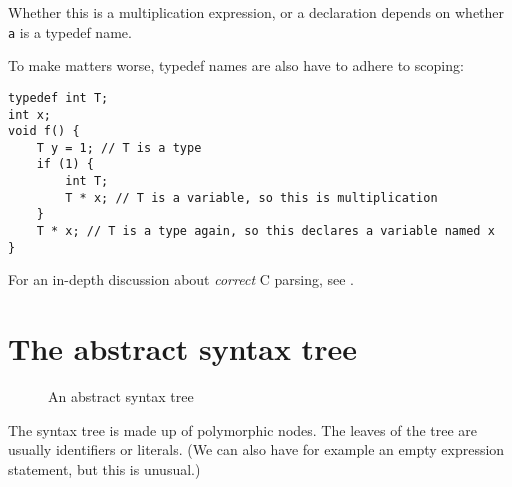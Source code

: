 \documentclass[12pt]{article}
\begin{document}
Whether this is a multiplication expression, or a declaration depends on
whether \texttt{a} is a typedef name.

To make matters worse, typedef names are also have to adhere to scoping:
\begin{center}
\begin{BVerbatim}
typedef int T;
int x;
void f() {
	T y = 1; // T is a type
	if (1) {
		int T;
		T * x; // T is a variable, so this is multiplication
	}
	T * x; // T is a type again, so this declares a variable named x
}
\end{BVerbatim}
\end{center}

For an in-depth discussion about \emph{correct} C parsing, see
\cite{c11_parsing}.

\section{The abstract syntax tree}

\begin{figure}
\centering
{}
\caption{An abstract syntax tree}
\label{fig:ast}
\end{figure}

The syntax tree is made up of polymorphic nodes. The leaves of the tree are
usually identifiers or literals. (We can also have for example an empty
expression statement, but this is unusual.)
\end{document}
